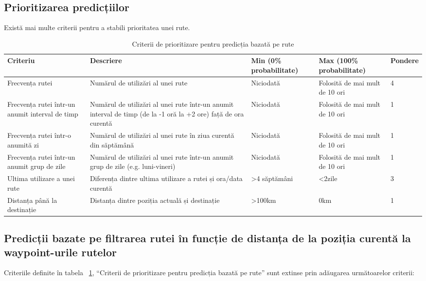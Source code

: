 		\subsection{Prioritizarea predicțiilor}
		Există mai multe criterii pentru a stabili prioritatea unei rute. 
		
		\begin{table}[!h]
		\caption{Criterii de prioritizare pentru predicția bazată pe rute}
		\centering
		\begin{tabular}{ | m{} | m{} | m{3,22cm} | m{} | m{} | }
		\hline
		\textbf{Criteriu} & \textbf{Descriere} & \textbf{Min (0\% probabilitate)} & \textbf{Max (100\% probabilitate)} & \textbf{Pondere} \\ 
		\hline
		 Frecvența rutei & Numărul de utilizări al unei rute & Niciodată & Folosită de mai mult de 10 ori & 4 \\
		\hline
		 Frecvența rutei într-un anumit interval de timp & Numărul de utilizări al unei rute într-un anumit interval de timp (de la -1 oră la +2 ore) față de ora curentă & Niciodată & Folosită de mai mult de 10 ori & 1 \\
		\hline
		 Frecvența rutei într-o anumită zi & Numărul de utilizări al unei rute în ziua curentă din săptămână & Niciodată & Folosită de mai mult de 10 ori & 1 \\
		\hline
		 Frecvența rutei într-un anumit grup de zile & Numărul de utilizări al unei rute într-un anumit grup de zile (e.g. luni-vineri)& Niciodată &  Folosită de mai mult de 10 ori  & 1 \\
		\hline
		 Ultima utilizare a unei rute & Diferența dintre ultima utilizare a rutei și ora/data curentă & >4 săptămâni & <2zile & 3 \\
		\hline
		 Distanța până la destinație & Distanța dintre poziția actuală și destinație & >100km & 0km & 1 \\
		\hline
		\end{tabular}
		\label{table:tabel_predictii}
		\end{table}
		
		
		\subsection{Predicții bazate pe filtrarea rutei în funcție de distanța de la poziția curentă la waypoint-urile rutelor}
		Criteriile definite în tabela ~\ref{table:tabel_predictii}, ``Criterii de prioritizare pentru predicția bazată pe rute'' sunt extinse prin adăugarea următoarelor criterii:
		
